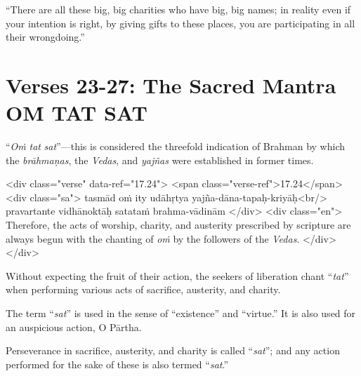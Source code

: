 \enquote{There are all these big, big charities who have big, big names; in reality even if your intention is right, by giving gifts to these places, you are participating in all their wrongdoing.}

\section{Verses 23-27: The Sacred Mantra OṀ TAT SAT}\label{sec-verses-23-27-the-sacred-mantra-om-tat-sat}

{\enquote{\textit{Oṁ} \textit{tat} \textit{sat}}---this is considered the threefold indication of Brahman by which the \textit{brāhmaṇas}, the \textit{Vedas}, and \textit{yajñas} were established in former times.}


\begin{html}
<div class="verse" data-ref="17.24">
  <span class="verse-ref">17.24</span>
  <div class="sa">
    tasmād oṁ ity udāhṛtya yajña-dāna-tapaḥ-kriyāḥ<br/>
    pravartante vidhānoktāḥ satataṁ brahma-vādinām
  </div>
  <div class="en">
    Therefore, the acts of worship, charity, and austerity prescribed by scripture are always begun with the chanting of \textit{oṁ} by the followers of the \textit{Vedas}.
  </div>
</div>
\end{html}


{Without expecting the fruit of their action, the seekers of liberation chant \enquote{\textit{tat}} when performing various acts of sacrifice, austerity, and charity.}

{The term \enquote{\textit{sat}} is used in the sense of \enquote{existence} and \enquote{virtue.} It is also used for an auspicious action, O Pārtha.}

{Perseverance in sacrifice, austerity, and charity is called \enquote{\textit{sat}}; and any action performed for the sake of these is also termed \enquote{\textit{sat}.}}

